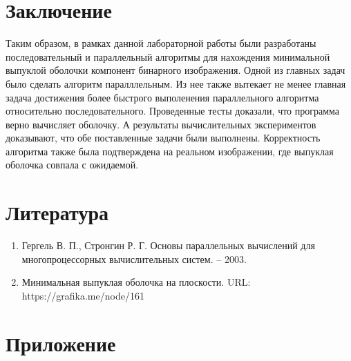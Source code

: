 \documentclass{report}
\begin{document}
\newpage

\section*{Заключение}
Таким образом, в рамках данной лабораторной работы были разработаны последовательный и параллельный алгоритмы для нахождения минимальной выпуклой оболочки компонент бинарного изображения. Одной из главных задач было сделать алгоритм паралллельным. Из нее также вытекает не менее главная задача достижения более быстрого выполенения параллельного алгоритма относительно последовательного. Проведенные тесты доказали, что программа верно вычисляет оболочку. А результаты вычислительных экспериментов доказывают, что обе поставленные задачи были выполнены. Корректность алгоритма также была подтверждена на реальном изображении, где выпуклая оболочка совпала с ожидаемой.
\newpage

\section*{Литература}
\begin{enumerate}
\item Гергель В. П., Стронгин Р. Г. Основы параллельных вычислений для многопроцессорных вычислительных систем. – 2003.
\item Минимальная выпуклая оболочка на плоскости. \newline URL: https://grafika.me/node/161
\end{enumerate} 
\newpage

\section*{Приложение}
\end{document}
